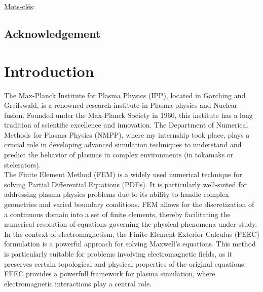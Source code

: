 \documentclass[a4paper,12pt,twoside]{report}
\begin{document}
\lipsum[1-2]

\vspace{1cm}

\underline{Mots-clés}:

\newpage\null

\newpage

\section*{Acknowledgement}
\lipsum[1-2]


\newpage
\tableofcontents
\thispagestyle{test}


\newpage
\chapter{Introduction}

The Max-Planck Institute for Plasma Physics (IPP), located in Garching and Greifswald, is a renowned research institute in Plasma physics and Nuclear fusion. Founded under the Max-Planck Society in 1960, this institute has a long tradition of scientific excellence and innovation. The Department of Numerical Methods for Plasma Physics (NMPP), where my internship took place, plays a crucial role in developing advanced simulation techniques to understand and predict the behavior of plasmas in complex environments (in tokamaks or stelerators). \\

The Finite Element Method (FEM) is a widely used numerical technique for solving Partial Differential Equations (PDEs). It is particularly well-suited for addressing plasma physics problems due to its ability to handle complex geometries and varied boundary conditions. FEM allows for the discretization of a continuous domain into a set of finite elements, thereby facilitating the numerical resolution of equations governing the physical phenomena under study. \\

In the context of electromagnetism, the Finite Element Exterior Calculus (FEEC) formulation is a powerful approach for solving Maxwell's equations. This method is particularly suitable for problems involving electromagnetic fields, as it preserves certain topological and physical properties of the original equations. FEEC provides a powerfull framework for plasma simulation, where electromagnetic interactions play a central role. \\
\end{document}
